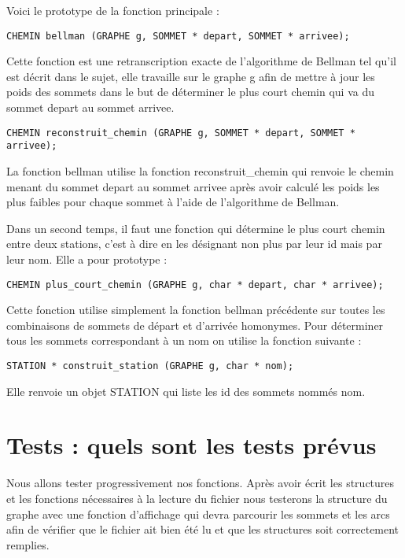\documentclass{report}
\begin{document}
Voici le prototype de la fonction principale :

\begin{lstlisting}
CHEMIN bellman (GRAPHE g, SOMMET * depart, SOMMET * arrivee);
\end{lstlisting}

Cette fonction est une retranscription exacte de l’algorithme de Bellman tel qu’il est décrit dans le sujet, elle travaille sur le graphe g afin de mettre à jour les poids des sommets dans le but de déterminer le plus court chemin qui va du sommet depart au sommet arrivee.

\begin{lstlisting}
CHEMIN reconstruit_chemin (GRAPHE g, SOMMET * depart, SOMMET * arrivee);
\end{lstlisting}

La fonction bellman utilise la fonction reconstruit\_chemin qui renvoie le chemin menant du sommet depart au sommet arrivee après avoir calculé les poids les plus faibles pour chaque sommet à l’aide de l’algorithme de Bellman.

Dans un second temps, il faut une fonction qui détermine le plus court chemin entre deux stations, c’est à dire en les désignant non plus par leur id mais par leur nom. Elle a pour prototype :

\begin{lstlisting}
CHEMIN plus_court_chemin (GRAPHE g, char * depart, char * arrivee);
\end{lstlisting}

Cette fonction utilise simplement la fonction bellman précédente sur toutes les combinaisons de sommets de départ et d’arrivée homonymes. Pour déterminer tous les sommets correspondant à un nom on utilise la fonction suivante : 

\begin{lstlisting}
STATION * construit_station (GRAPHE g, char * nom);
\end{lstlisting}

Elle renvoie un objet STATION qui liste les id des sommets nommés nom.

\section{Tests : quels sont les tests prévus}

Nous allons tester progressivement nos fonctions. Après avoir écrit les structures et les fonctions nécessaires à la lecture du fichier nous testerons la structure du graphe avec une fonction d’affichage qui devra parcourir les sommets et les arcs afin de vérifier que le fichier ait bien été lu et que les structures soit correctement remplies.
\end{document}
